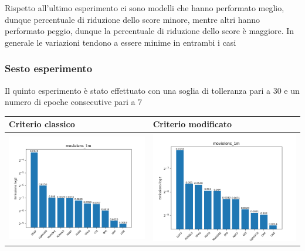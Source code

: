 \noindent Rispetto all'ultimo esperimento ci sono modelli che hanno performato meglio, dunque percentuale di riduzione dello score minore, mentre altri hanno performato peggio, dunque la percentuale di riduzione dello score è maggiore. In generale le variazioni tendono a essere minime in entrambi i casi



\subsubsection{Sesto esperimento}

Il quinto esperimento è stato effettuato con una soglia di tolleranza pari a 30 e un numero di epoche consecutive pari a 7


\begin{table}[H]
    \centering
    \footnotesize
    \setlength\tabcolsep{0pt}
    \begin{tabularx}{\textwidth}{|X|X|}
        \hline
        \textbf{Criterio classico} & \textbf{Criterio modificato} \\
        \hline
        \includegraphics[width=\linewidth, trim=0 0 0 0]{images/emissions_movielens_1m_30_7_earlyClassic.png} &
        \includegraphics[width=\linewidth, trim=0 0 0 0]{images/emissions_movielens_1m_30_7_earlyModified.png} \\

\end{tabularx}
\end{table}

